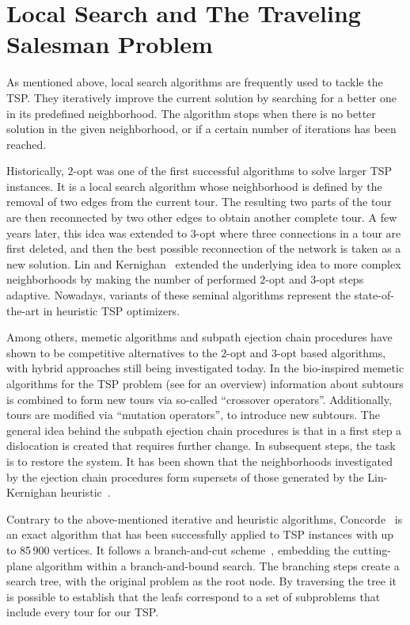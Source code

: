 \documentclass{article}
\begin{document}
\section{Local Search and The Traveling Salesman Problem}
\label{sec2}
As mentioned above, local search algorithms are frequently used to
tackle the TSP. They iteratively improve the current solution by
searching for a better one in its predefined neighborhood. The
algorithm stops when there is no better solution in the given
neighborhood, or if a certain number of iterations has been reached.

Historically, $2$-opt \cite{croes1958} was one of the first successful
algorithms to solve larger TSP instances. It is a local search
algorithm whose neighborhood is defined by the removal of two edges
from the current tour. The resulting two parts of the tour are then
reconnected by two other edges to obtain another complete tour.  A few
years later, this idea was extended to $3$-opt \cite{Lin:1965} where
three connections in a tour are first deleted, and then the best
possible reconnection of the network is taken as a new solution.  Lin
and Kernighan~\cite{LinKin73} extended the underlying idea to more
complex neighborhoods by making the number of performed $2$-opt and
$3$-opt steps adaptive. Nowadays, variants of these seminal algorithms
represent the state-of-the-art in heuristic TSP optimizers.

Among others, memetic algorithms and subpath ejection chain procedures
have shown to be competitive alternatives to the $2$-opt and $3$-opt
based algorithms, with hybrid approaches still being investigated
today.  In the bio-inspired memetic algorithms for the TSP problem
(see \cite{merz2001} for an overview) information about subtours is
combined to form new tours via so-called ``crossover
operators''. Additionally, tours are modified via ``mutation
operators'', to introduce new subtours. The general idea behind the
subpath ejection chain procedures is that in a first step a
dislocation is created that requires further change. In subsequent
steps, the task is to restore the system. It has been shown that the
neighborhoods investigated by the ejection chain procedures form
supersets of those generated by the Lin-Kernighan
heuristic~\cite{journals/dam/Glover96}.

Contrary to the above-mentioned iterative and heuristic algorithms,
Concorde~\cite{journals/informs/ApplegateCDR02} is an exact algorithm
that has been successfully applied to TSP instances with up to 85\,900
vertices. It follows a branch-and-cut scheme~\cite{PadbergRinaldi:91},
embedding the cutting-plane algorithm within a branch-and-bound
search.  The branching steps create a search tree, with the original
problem as the root node.  By traversing the tree it is possible to
establish that the leafs correspond to a set of subproblems that
include every tour for our TSP.
\end{document}
